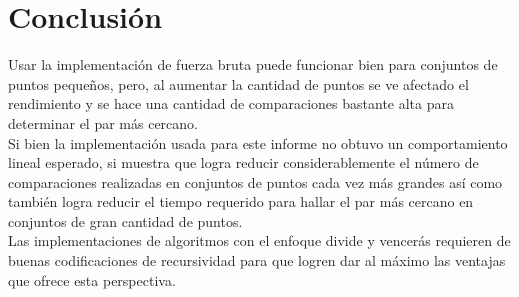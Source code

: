 \section{Conclusión}
Usar la implementación de fuerza bruta puede funcionar bien para conjuntos de puntos pequeños, pero, al aumentar la cantidad de puntos se ve afectado el rendimiento y se hace una cantidad de comparaciones bastante alta para determinar el par más cercano.\\

Si bien la implementación usada para este informe no obtuvo un comportamiento lineal esperado, si muestra que logra reducir considerablemente el número de comparaciones realizadas en conjuntos de puntos cada vez más grandes así como también logra reducir el tiempo requerido para hallar el par más cercano en conjuntos de gran cantidad de puntos.\\

Las implementaciones de algoritmos con el enfoque divide y vencerás requieren de buenas codificaciones de recursividad para que logren dar al máximo las ventajas que ofrece esta perspectiva.\\